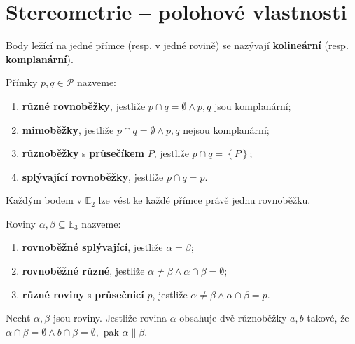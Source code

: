 \section{Stereometrie -- polohové vlastnosti}

\begin{definition}
    Body ležící na jedné přímce (resp. v jedné rovině) se nazývají \textbf{kolineární}
    (resp. \textbf{komplanární}).
\end{definition}

\begin{definition}
    Přímky $p,q \in \mathscr P$ nazveme:
    \begin{enumerate}[$i.$]
        \item \textbf{různé rovnoběžky}, jestliže $p\cap q = \emptyset \land
            p,q$ jsou komplanární;
        \item \textbf{mimoběžky}, jestliže $p\cap q = \emptyset \land p,q$ nejsou
            komplanární;
        \item \textbf{různoběžky} s \textbf{průsečíkem} $P$, jestliže $p\cap q =
            \left \{ P \right \} $;
       	\item \textbf{splývající rovnoběžky}, jestliže $p\cap q = p$.
    \end{enumerate}
\end{definition}

\begin{veta}
    Každým bodem v $\mathbb E_2$ lze vést ke každé přímce právě jednu rovnoběžku.
\end{veta}

\begin{definition}
    Roviny $\alpha,\beta \subseteq \mathbb E_3$ nazveme:
    \begin{enumerate}[$i.$]
        \item \textbf{rovnoběžné splývající}, jestliže $\alpha = \beta$;
        \item \textbf{rovnoběžné různé}, jestliže $\alpha \ne \beta \land \alpha \cap
        \beta = \emptyset$;
        \item \textbf{různé roviny} s \textbf{průsečnicí} $p$, jestliže $\alpha
        \ne \beta \land \alpha \cap \beta = p$.
    \end{enumerate}
\end{definition}

\begin{veta}
    Nechť $\alpha, \beta$ jsou roviny. Jestliže rovina $\alpha$ obsahuje dvě různoběžky
    $a,b$ takové, že $\alpha \cap \beta = \emptyset \land b \cap \beta = \emptyset,$
    pak $\alpha \parallel \beta.$
\end{veta}

